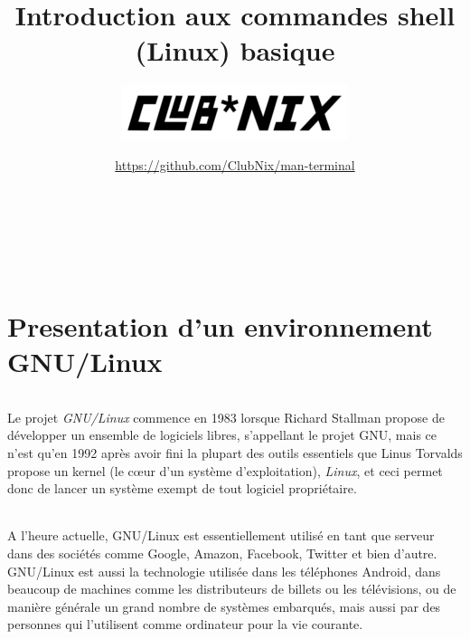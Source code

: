 \documentclass[french, a4paper, 12pt, titlepage]{article}
\begin{document}
\title{Introduction aux commandes shell (Linux) basique}
\author{\includegraphics[scale=0.7]{clubnix}}
\date{\url{https://github.com/ClubNix/man-terminal}}

\maketitle

\vfill
\pagebreak
\newpage
\thispagestyle{empty}
~


\strut\thispagestyle{empty}
\vfill
\pagebreak
\tableofcontents
\strut\thispagestyle{empty}

\vfill
\pagebreak
\newpage
\thispagestyle{empty}
~
\pagebreak

\setcounter{page}{1}

\part{Presentation d'un environnement GNU/Linux}

\paragraph{}
Le projet \textit{GNU/Linux} commence en 1983 lorsque Richard Stallman propose
de développer un ensemble de logiciels libres, s'appellant le projet GNU, mais
ce n'est qu'en 1992 après avoir fini la plupart des outils essentiels que Linus
Torvalds propose un kernel (le cœur d'un système d'exploitation),
\textit{Linux}, et ceci permet donc de lancer un système exempt de tout
logiciel propriétaire.

\paragraph{}
A l'heure actuelle, GNU/Linux est essentiellement utilisé en tant que serveur
dans des sociétés comme Google, Amazon, Facebook, Twitter et bien d'autre.
GNU/Linux est aussi la technologie utilisée dans les téléphones Android, dans
beaucoup de machines comme les distributeurs de billets ou les télévisions, ou
de manière générale un grand nombre de systèmes embarqués, mais aussi par des
personnes qui l'utilisent comme ordinateur pour la vie courante.
\end{document}
